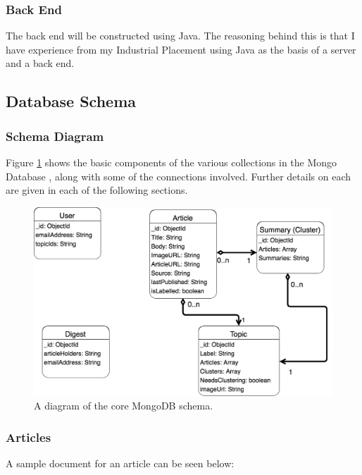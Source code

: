 \documentclass[12pt]{article}
\begin{document}
\subsubsection{Back End}

The back end will be constructed using Java. The reasoning behind this is that I have experience from my Industrial Placement using Java as the basis of a server and a back end.

\subsection{Database Schema}

\label{database}

\subsubsection{Schema Diagram}

Figure \ref{dbschema} shows the basic components of the various collections in the Mongo Database \cite{mongodb}, along with some of the connections involved. Further details on each are given in each of the following sections.

\begin{figure}[ht!]
  \centering
    \includegraphics[width=\textwidth]{DBSchema.png}
   \caption[A diagram of the MongoDB schema]{A diagram of the core MongoDB schema.}
   \label{dbschema}
\end{figure} 

\subsubsection{Articles}

A sample document for an article can be seen below:
\end{document}
